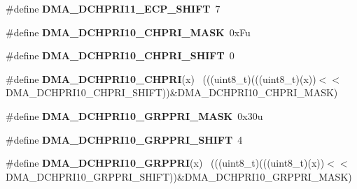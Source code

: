 \begin{DoxyCompactItemize}
\item 
\hypertarget{group___d_m_a___register___masks_gadd7793c7e5fb49aed57108e5fef14683}{}\#define {\bfseries D\+M\+A\+\_\+\+D\+C\+H\+P\+R\+I11\+\_\+\+E\+C\+P\+\_\+\+S\+H\+I\+F\+T}~7\label{group___d_m_a___register___masks_gadd7793c7e5fb49aed57108e5fef14683}

\item 
\hypertarget{group___d_m_a___register___masks_ga3b501306e4d14b013245e0cc3b4758dc}{}\#define {\bfseries D\+M\+A\+\_\+\+D\+C\+H\+P\+R\+I10\+\_\+\+C\+H\+P\+R\+I\+\_\+\+M\+A\+S\+K}~0x\+Fu\label{group___d_m_a___register___masks_ga3b501306e4d14b013245e0cc3b4758dc}

\item 
\hypertarget{group___d_m_a___register___masks_ga5932de8a8d3c8b2b657f415258c430d9}{}\#define {\bfseries D\+M\+A\+\_\+\+D\+C\+H\+P\+R\+I10\+\_\+\+C\+H\+P\+R\+I\+\_\+\+S\+H\+I\+F\+T}~0\label{group___d_m_a___register___masks_ga5932de8a8d3c8b2b657f415258c430d9}

\item 
\hypertarget{group___d_m_a___register___masks_ga652a904518c325644737c73499034f52}{}\#define {\bfseries D\+M\+A\+\_\+\+D\+C\+H\+P\+R\+I10\+\_\+\+C\+H\+P\+R\+I}(x)                                    ~(((uint8\+\_\+t)(((uint8\+\_\+t)(x))$<$$<$D\+M\+A\+\_\+\+D\+C\+H\+P\+R\+I10\+\_\+\+C\+H\+P\+R\+I\+\_\+\+S\+H\+I\+F\+T))\&D\+M\+A\+\_\+\+D\+C\+H\+P\+R\+I10\+\_\+\+C\+H\+P\+R\+I\+\_\+\+M\+A\+S\+K)\label{group___d_m_a___register___masks_ga652a904518c325644737c73499034f52}

\item 
\hypertarget{group___d_m_a___register___masks_ga925a70536e71a5d4f9571f506ada8ffb}{}\#define {\bfseries D\+M\+A\+\_\+\+D\+C\+H\+P\+R\+I10\+\_\+\+G\+R\+P\+P\+R\+I\+\_\+\+M\+A\+S\+K}~0x30u\label{group___d_m_a___register___masks_ga925a70536e71a5d4f9571f506ada8ffb}

\item 
\hypertarget{group___d_m_a___register___masks_ga52a88d28c6fbc973a50d22853b5735ad}{}\#define {\bfseries D\+M\+A\+\_\+\+D\+C\+H\+P\+R\+I10\+\_\+\+G\+R\+P\+P\+R\+I\+\_\+\+S\+H\+I\+F\+T}~4\label{group___d_m_a___register___masks_ga52a88d28c6fbc973a50d22853b5735ad}

\item 
\hypertarget{group___d_m_a___register___masks_ga7d35b88092cc72697a44c0ebb3e4c78c}{}\#define {\bfseries D\+M\+A\+\_\+\+D\+C\+H\+P\+R\+I10\+\_\+\+G\+R\+P\+P\+R\+I}(x)                                  ~(((uint8\+\_\+t)(((uint8\+\_\+t)(x))$<$$<$D\+M\+A\+\_\+\+D\+C\+H\+P\+R\+I10\+\_\+\+G\+R\+P\+P\+R\+I\+\_\+\+S\+H\+I\+F\+T))\&D\+M\+A\+\_\+\+D\+C\+H\+P\+R\+I10\+\_\+\+G\+R\+P\+P\+R\+I\+\_\+\+M\+A\+S\+K)\label{group___d_m_a___register___masks_ga7d35b88092cc72697a44c0ebb3e4c78c}


\end{DoxyCompactItemize}
